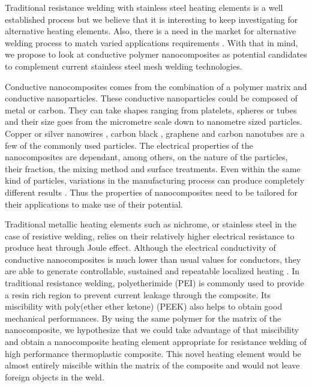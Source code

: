 \documentclass[11pt,review,times]{elsarticle}
\begin{document}
Traditional resistance welding with stainless steel heating elements is a well established process but we believe that it is interesting to keep investigating for alternative heating elements. 
Also, there is a need in the market for alternative welding process to match varied applications requirements \cite{CompositeWorldSloan2018}. 
With that in mind, we propose to look at conductive polymer nanocomposites as potential candidates to complement current stainless steel mesh welding technologies. 

Conductive nanocomposites comes from the combination of a polymer matrix and conductive nanoparticles. 
These conductive nanoparticles could be composed of metal or carbon. 
They can take shapes ranging from platelets, spheres or tubes and their size goes from the micrometre scale down to nanometre sized particles. 
Copper or silver nanowires \cite{Gelves2008a, Al-Saleh2011, Li2015a, Riviere2016}, carbon black \cite{Jin2013, MohdRadzuan2017}, graphene \cite{Jiang2012a, Hu2014a} and carbon nanotubes \cite{Diez-Pascual2011,Huegun2013,Kazakova2014,Jia2015} are a few of the commonly used particles. 
The electrical properties of the nanocomposites are dependant, among others, on the nature of the particles, their fraction, the mixing method and surface treatments. 
Even within the same kind of particles, variations in the manufacturing process can produce completely different results \cite{Bauhofer2009}. 
Thus the properties of nanocomposites need to be tailored for their applications to make use of their potential. 

Traditional metallic heating elements such as nichrome, or stainless steel in the case of resistive welding, relies on their relatively higher electrical resistance to produce heat through Joule effect. 
Although the electrical conductivity of conductive nanocomposites is much lower than usual values for conductors, they are able to generate controllable, sustained and repeatable localized heating \cite{Pyo2016}. 
In traditional resistance welding, polyetherimide (PEI) is commonly used to provide a resin rich region to prevent current leakage through the composite. 
Its miscibility with poly(ether ether ketone) (PEEK) \cite{Crevecoeur1991} also helps to obtain good mechanical performances.
By using the same polymer for the matrix of the nanocomposite, we hypothesize that we could take advantage of that miscibility and obtain a nanocomposite heating element appropriate for resistance welding of high performance thermoplastic composite. 
This novel heating element would be almost entirely miscible within the matrix of the composite and would not leave foreign objects in the weld. 
\end{document}
